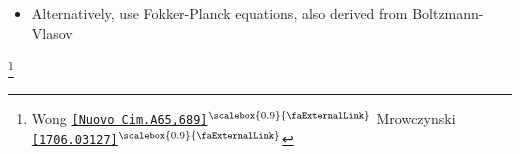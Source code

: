 \documentclass[aspectratio=169,11pt,usenames,dvipsnames]{beamer}
\renewcommand{\thefootnote}{\color{customblue}\faPaperPlaneO}
\newcommand\blfootnote[1]{%
  \begingroup
  \renewcommand\thefootnote{}\footnote{#1}%
  \addtocounter{footnote}{-1}%
  \endgroup
}
\begin{document}
\begin{frame}
\begin{itemize}
        \item \begin{center}\footnotesize Alternatively, use {\color{palgold}Fokker-Planck equations}, also derived from Boltzmann-Vlasov \end{center} 
    \end{itemize}
    \blfootnote{\scriptsize Wong \href{https://link.springer.com/article/10.1007/BF02892134}{{\color{palteal}\texttt{[Nuovo Cim.A65,689]}$^\text{\scalebox{0.9}{\faExternalLink}}$}} Mrowczynski \href{https://arxiv.org/abs/1706.03127}{{\color{palgold}\texttt{[1706.03127]}$^\text{\scalebox{0.9}{\faExternalLink}}$}}}
\end{frame}


\end{document}
